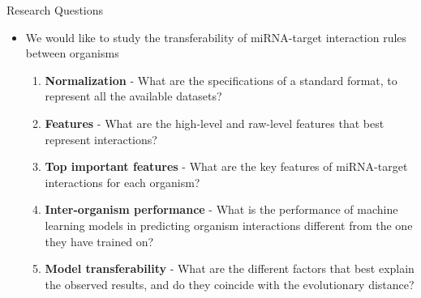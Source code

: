 \documentclass{beamer}
\begin{document}
\begin{frame}{Research Questions}
	\begin{itemize}

\item We would like to study the transferability of miRNA-target interaction rules between organisms
\begin{enumerate}
\item \textbf{Normalization} - What are the specifications of a standard format, to represent all the available datasets?
\pause
\item \textbf{Features} - What are the high-level and raw-level features that best represent interactions?
\pause
\item \textbf{Top important features} - What are the key features of miRNA-target interactions for each organism?
\pause
\item \textbf{Inter-organism  performance} - What is the performance of machine learning models in predicting organism interactions different from the one they have trained on?
\pause
\item \textbf{Model transferability} - What are the different factors that best explain the observed results, and do they coincide with the evolutionary distance?
\end{enumerate}

	\end{itemize}
\end{frame}



\end{document}
